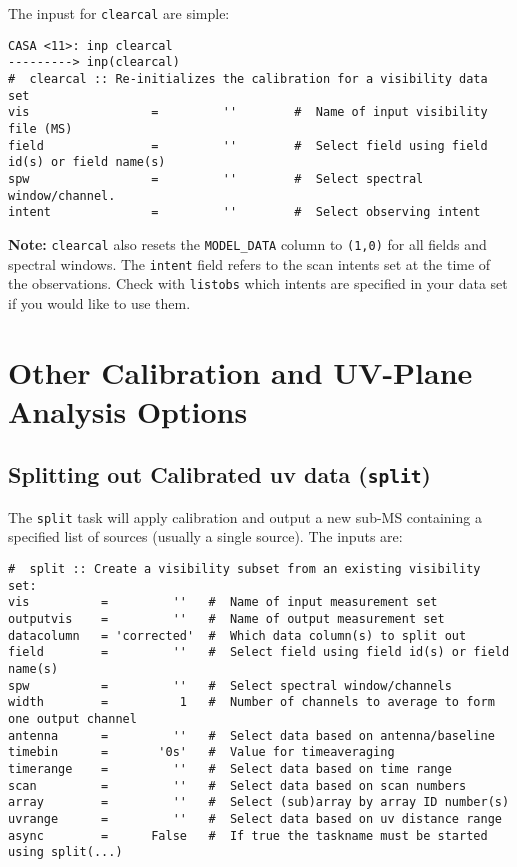 The inpust for {\tt clearcal} are simple:
\small
\begin{verbatim}
CASA <11>: inp clearcal
---------> inp(clearcal)
#  clearcal :: Re-initializes the calibration for a visibility data set
vis                 =         ''        #  Name of input visibility file (MS)
field               =         ''        #  Select field using field id(s) or field name(s)
spw                 =         ''        #  Select spectral window/channel.
intent              =         ''        #  Select observing intent

\end{verbatim}
\normalsize

{\bf Note:} {\tt clearcal} also resets the {\tt MODEL\_DATA} column
to {\tt (1,0)} for all fields and spectral windows. The {\tt intent}
field refers to the scan intents set at the time of the
observations. Check with {\tt listobs} which intents are specified in
your data set if you would like to use them.  

\section{Other Calibration and UV-Plane Analysis Options}
\label{section:cal.other}

\subsection{Splitting out Calibrated uv data ({\tt split})}
\label{section:cal.other.split}

The {\tt split} task will apply calibration and output a new sub-MS
containing a specified list of sources (usually a single source).
The inputs are:
\small
\begin{verbatim}
#  split :: Create a visibility subset from an existing visibility set:
vis          =         ''   #  Name of input measurement set
outputvis    =         ''   #  Name of output measurement set
datacolumn   = 'corrected'  #  Which data column(s) to split out
field        =         ''   #  Select field using field id(s) or field name(s)
spw          =         ''   #  Select spectral window/channels
width        =          1   #  Number of channels to average to form one output channel
antenna      =         ''   #  Select data based on antenna/baseline
timebin      =       '0s'   #  Value for timeaveraging
timerange    =         ''   #  Select data based on time range
scan         =         ''   #  Select data based on scan numbers
array        =         ''   #  Select (sub)array by array ID number(s)
uvrange      =         ''   #  Select data based on uv distance range
async        =      False   #  If true the taskname must be started using split(...)
\end{verbatim}
\normalsize

